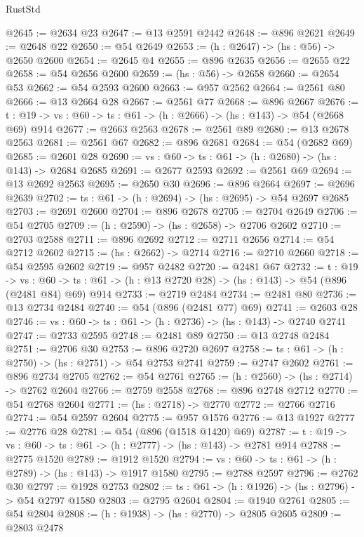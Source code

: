 \begin{lexlean}{RustStd}
\begin{coremodule}
@2645 := @2634 @23
@2647 := @13 @2591 @2442
@2648 := @896 @2621
@2649 := @2648 @22
@2650 := @54 @2649
@2653 := (h : @2647) -> (hs : @56) -> @2650 @2600
@2654 := @2645 @4
@2655 := @896 @2635
@2656 := @2655 @22
@2658 := @54 @2656 @2600
@2659 := (hs : @56) -> @2658
@2660 := @2654 @53
@2662 := @54 @2593 @2600
@2663 := @957 @2562
@2664 := @2561 @80
@2666 := @13 @2664 @28
@2667 := @2561 @77
@2668 := @896 @2667
@2676 := {t : @19} -> {vs : @60} -> {ts : @61} -> (h : @2666) -> (hs : @143) -> @54 (@2668 @69) @914
@2677 := @2663 @2563
@2678 := @2561 @89
@2680 := @13 @2678 @2563
@2681 := @2561 @67
@2682 := @896 @2681
@2684 := @54 (@2682 @69)
@2685 := @2601 @28
@2690 := {vs : @60} -> {ts : @61} -> (h : @2680) -> (hs : @143) -> @2684 @2685
@2691 := @2677 @2593
@2692 := @2561 @69
@2694 := @13 @2692 @2563
@2695 := @2650 @30
@2696 := @896 @2664
@2697 := @2696 @2639
@2702 := {ts : @61} -> (h : @2694) -> (hs : @2695) -> @54 @2697 @2685
@2703 := @2691 @2600
@2704 := @896 @2678
@2705 := @2704 @2649
@2706 := @54 @2705
@2709 := (h : @2590) -> (hs : @2658) -> @2706 @2602
@2710 := @2703 @2588
@2711 := @896 @2692
@2712 := @2711 @2656
@2714 := @54 @2712 @2602
@2715 := (hs : @2662) -> @2714
@2716 := @2710 @2660
@2718 := @54 @2595 @2602
@2719 := @957 @2482
@2720 := @2481 @67
@2732 := {t : @19} ->
  {vs : @60} -> {ts : @61} -> (h : @13 @2720 @28) -> (hs : @143) -> @54 (@896 (@2481 @84) @69) @914
@2733 := @2719 @2484
@2734 := @2481 @80
@2736 := @13 @2734 @2484
@2740 := @54 (@896 (@2481 @77) @69)
@2741 := @2603 @28
@2746 := {vs : @60} -> {ts : @61} -> (h : @2736) -> (hs : @143) -> @2740 @2741
@2747 := @2733 @2595
@2748 := @2481 @89
@2750 := @13 @2748 @2484
@2751 := @2706 @30
@2753 := @896 @2720 @2697
@2758 := {ts : @61} -> (h : @2750) -> (hs : @2751) -> @54 @2753 @2741
@2759 := @2747 @2602
@2761 := @896 @2734 @2705
@2762 := @54 @2761
@2765 := (h : @2560) -> (hs : @2714) -> @2762 @2604
@2766 := @2759 @2558
@2768 := @896 @2748 @2712
@2770 := @54 @2768 @2604
@2771 := (hs : @2718) -> @2770
@2772 := @2766 @2716
@2774 := @54 @2597 @2604
@2775 := @957 @1576
@2776 := @13 @1927
@2777 := @2776 @28
@2781 := @54 (@896 (@1518 @1420) @69)
@2787 := {t : @19} -> {vs : @60} -> {ts : @61} -> (h : @2777) -> (hs : @143) -> @2781 @914
@2788 := @2775 @1520
@2789 := @1912 @1520
@2794 := {vs : @60} -> {ts : @61} -> (h : @2789) -> (hs : @143) -> @1917 @1580
@2795 := @2788 @2597
@2796 := @2762 @30
@2797 := @1928 @2753
@2802 := {ts : @61} -> (h : @1926) -> (hs : @2796) -> @54 @2797 @1580
@2803 := @2795 @2604
@2804 := @1940 @2761
@2805 := @54 @2804
@2808 := (h : @1938) -> (hs : @2770) -> @2805 @2605
@2809 := @2803 @2478

\end{coremodule}
\end{lexlean}
